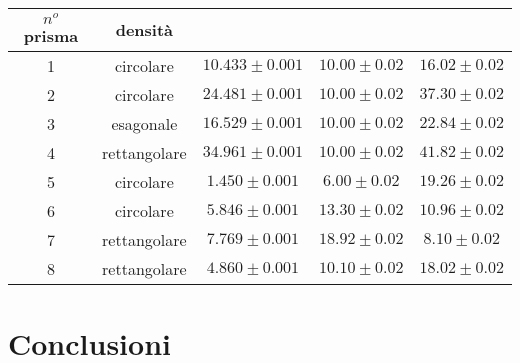 \documentclass[8pt]{article}
\begin{document}
\begin{center}
\begin{tabular}{ c c c c c }
\toprule
$n^o$ prisma & densità\\
\midrule
1 & circolare & $10.433 \pm 0.001$ & $10.00 \pm 0.02$ & $16.02 \pm 0.02$ \\
2 & circolare & $24.481 \pm 0.001$ & $10.00 \pm 0.02$ & $37.30 \pm 0.02$\\
3 & esagonale & $16.529 \pm 0.001$ & $10.00 \pm 0.02$ & $22.84 \pm 0.02$ \\
4 & rettangolare & $34.961 \pm 0.001$ & $10.00 \pm 0.02$ & $41.82 \pm 0.02$  \\
5 & circolare & $1.450 \pm 0.001$ & $6.00 \pm 0.02$ & $19.26 \pm 0.02$  \\
6 & circolare & $5.846 \pm 0.001$ & $13.30 \pm 0.02$ & $10.96 \pm 0.02$  \\
7 & rettangolare & $7.769 \pm 0.001$ & $18.92 \pm 0.02$ & $8.10 \pm 0.02$  \\
8 & rettangolare & $4.860 \pm 0.001$ & $10.10 \pm 0.02$ & $18.02 \pm 0.02$  \\
\bottomrule
\end{tabular}
\end{center}

\pagebreak

\section{Conclusioni}
\end{document}
